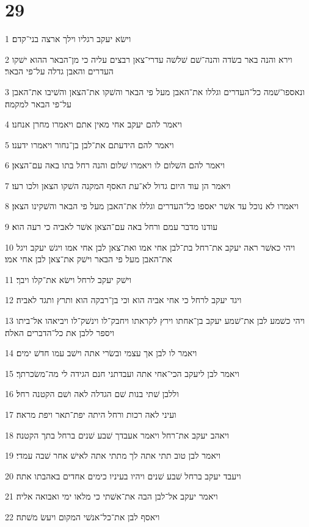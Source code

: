 \chapter{29}

\par 1 וישׂא יעקב רגליו וילך ארצה בני־קדם׃
\par 2 וירא והנה באר בשׂדה והנה־שׁם שׁלשׁה עדרי־צאן רבצים עליה כי מן־הבאר ההוא ישׁקו העדרים והאבן גדלה על־פי הבאר׃
\par 3 ונאספו־שׁמה כל־העדרים וגללו את־האבן מעל פי הבאר והשׁקו את־הצאן והשׁיבו את־האבן על־פי הבאר למקמה׃
\par 4 ויאמר להם יעקב אחי מאין אתם ויאמרו מחרן אנחנו׃
\par 5 ויאמר להם הידעתם את־לבן בן־נחור ויאמרו ידענו׃
\par 6 ויאמר להם השׁלום לו ויאמרו שׁלום והנה רחל בתו באה עם־הצאן׃
\par 7 ויאמר הן עוד היום גדול לא־עת האסף המקנה השׁקו הצאן ולכו רעו׃
\par 8 ויאמרו לא נוכל עד אשׁר יאספו כל־העדרים וגללו את־האבן מעל פי הבאר והשׁקינו הצאן׃
\par 9 עודנו מדבר עמם ורחל באה עם־הצאן אשׁר לאביה כי רעה הוא׃
\par 10 ויהי כאשׁר ראה יעקב את־רחל בת־לבן אחי אמו ואת־צאן לבן אחי אמו ויגשׁ יעקב ויגל את־האבן מעל פי הבאר וישׁק את־צאן לבן אחי אמו׃
\par 11 וישׁק יעקב לרחל וישׂא את־קלו ויבך׃
\par 12 ויגד יעקב לרחל כי אחי אביה הוא וכי בן־רבקה הוא ותרץ ותגד לאביה׃
\par 13 ויהי כשׁמע לבן את־שׁמע יעקב בן־אחתו וירץ לקראתו ויחבק־לו וינשׁק־לו ויביאהו אל־ביתו ויספר ללבן את כל־הדברים האלה׃
\par 14 ויאמר לו לבן אך עצמי ובשׂרי אתה וישׁב עמו חדשׁ ימים׃
\par 15 ויאמר לבן ליעקב הכי־אחי אתה ועבדתני חנם הגידה לי מה־משׂכרתך׃
\par 16 וללבן שׁתי בנות שׁם הגדלה לאה ושׁם הקטנה רחל׃
\par 17 ועיני לאה רכות ורחל היתה יפת־תאר ויפת מראה׃
\par 18 ויאהב יעקב את־רחל ויאמר אעבדך שׁבע שׁנים ברחל בתך הקטנה׃
\par 19 ויאמר לבן טוב תתי אתה לך מתתי אתה לאישׁ אחר שׁבה עמדי׃
\par 20 ויעבד יעקב ברחל שׁבע שׁנים ויהיו בעיניו כימים אחדים באהבתו אתה׃
\par 21 ויאמר יעקב אל־לבן הבה את־אשׁתי כי מלאו ימי ואבואה אליה׃
\par 22 ויאסף לבן את־כל־אנשׁי המקום ויעשׂ משׁתה׃
